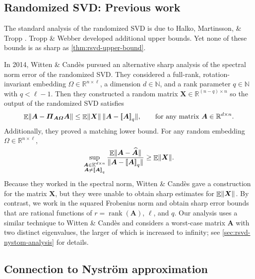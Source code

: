 \documentclass[11pt]{article}
\newcommand{\real}{\mathbb{R}}
\newcommand{\field}{\mathbb{K}}
\DeclareMathOperator{\rank}{rank}
\newcommand{\mat}[1]{\boldsymbol{#1}}
\newcommand{\lowrank}[1]{%
  \mleft[\!\mleft[ #1 \mright]\!\mright]}
\newcommand{\norm}[1]{\mleft\| #1 \mright\|}
\DeclareMathOperator{\expect}{\mathbb{E}}
\newcommand{\hatbold}[1]{%
  \skew{4}\widehat{\smash{\boldsymbol{#1}}\mathstrut}}
\newcommand{\Ahat}{\smash{\hatbold{A}}}
\theoremstyle{definition}
\numberwithin{equation}{section}
\begin{document}
\subsection{Randomized SVD: Previous work}\label{sec:rsvd-previous}

The standard analysis of the randomized SVD is due to Halko, Martinsson, \& Tropp \cite{HMT11}.
Tropp \& Webber \cite{TW23a} developed additional upper bounds.
Yet none of these bounds is as sharp as \cref{thm:rsvd-upper-bound}.

In 2014, Witten \& Cand\`es \cite[Thms.~1.2 \& 3.1]{witten2014randomized} pursued an alternative sharp analysis of the spectral norm error of the randomized SVD.
They considered a full-rank, rotation-invariant embedding $\mat{\varOmega} \in \real^{n\times \ell}$, a dimension $d \in \mathbb{N}$, and a rank parameter $q \in \mathbb{N}$ with $q < \ell - 1$.
Then they constructed a random matrix $\mat{X} \in \real^{(n-q) \times n}$ so the output of the randomized SVD satisfies
%
\begin{equation*}
    \expect \norm{\smash{\mat{A} - \mat{\varPi}_{\mat{A} \mat{\varOmega}} \mat{A}}} \le \expect \norm{\mat{X}} \, 
    \norm{\smash{\mat{A} - \lowrank{\mat{A}}_q}},
    \qquad \text{for any matrix } \mat{A} \in \real^{d \times n}.
\end{equation*}
%
Additionally, they proved a matching lower bound.
For any random embedding $\mat{\varOmega} \in \real^{n\times \ell}$,
%
\begin{equation*}
    \sup_{\substack{\mat{A} \in \field^{d \times n} \\ \mat{A}\neq\lowrank{\mat{A}}_q}} \frac{\expect \norm{\mat{A} - \Ahat}}{\norm{\smash{\mat{A} - \lowrank{\mat{A}}_q}}} \geq \expect \norm{\mat{X}}.
\end{equation*}
Because they worked in the spectral norm, Witten \& Cand\`es gave a construction for the matrix $\mat{X}$, but they were unable to obtain sharp estimates for $\expect \norm{\mat{X}}$.
By contrast, we work in the squared Frobenius norm and obtain sharp error bounds that are rational functions of $r=\rank(\mat{A})$, $\ell$, and $q$.
Our analysis uses a similar technique to Witten \& Cand\`es and considers a worst-case matrix $\mat{A}$ with two distinct eigenvalues, the larger of which is increased to infinity; see \cref{sec:rsvd-nystom-analysis} for details.

\subsection{Connection to Nystr\"om approximation}
\end{document}
